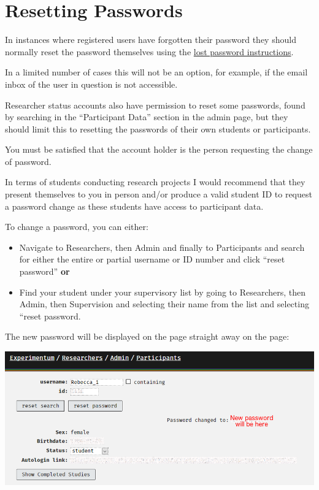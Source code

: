 \documentclass[]{book}
\begin{document}
\section*{Resetting Passwords}\label{resetting-passwords}

In instances where registered users have forgotten their password they
should normally reset the password themselves using the
\protect\hyperlink{lost_password}{lost password instructions}.

In a limited number of cases this will not be an option, for example, if
the email inbox of the user in question is not accessible.

Researcher status accounts also have permission to reset some passwords,
found by searching in the ``Participant Data'' section in the admin
page, but they should limit this to resetting the passwords of their own
students or participants.

\begin{danger}
You must be satisfied that the account holder is the person requesting
the change of password.

In terms of students conducting research projects I would recommend that
they present themselves to you in person and/or produce a valid student
ID to request a password change as these students have access to
participant data.
\end{danger}

To change a password, you can either:

\begin{itemize}
\item
  Navigate to Researchers, then Admin and finally to Participants and
  search for either the entire or partial username or ID number and
  click ``reset password'' \textbf{or}
\item
  Find your student under your supervisory list by going to Researchers,
  then Admin, then Supervision and selecting their name from the list
  and selecting ``reset password.
\end{itemize}

The new password will be displayed on the page straight away on the
page:

\includegraphics{images/screenshots/reset_password.png}
\end{document}
